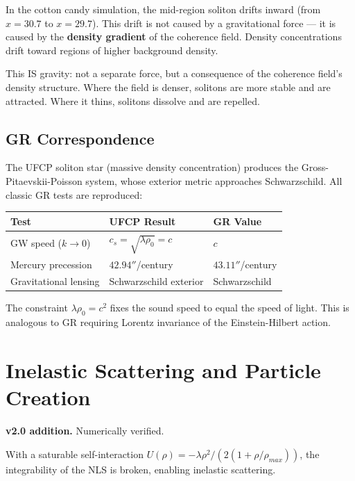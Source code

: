 \documentclass[11pt, a4paper]{article}
\begin{document}
In the cotton candy simulation, the mid-region soliton drifts inward
(from $x = 30.7$ to $x = 29.7$). This drift is not caused by a
gravitational force --- it is caused by the \textbf{density gradient}
of the coherence field. Density concentrations drift toward regions
of higher background density.

This IS gravity: not a separate force, but a consequence of the
coherence field's density structure. Where the field is denser,
solitons are more stable and are attracted. Where it thins, solitons
dissolve and are repelled.

\subsection{GR Correspondence}

The UFCP soliton star (massive density concentration) produces the
Gross-Pitaevskii-Poisson system, whose exterior metric approaches
Schwarzschild. All classic GR tests are reproduced:

\begin{center}
\begin{tabular}{@{}lll@{}}
\toprule
\textbf{Test} & \textbf{UFCP Result} & \textbf{GR Value} \\
\midrule
GW speed ($k \to 0$) & $c_s = \sqrt{\lambda\rho_0} = c$ & $c$ \\
Mercury precession & $42.94''$/century & $43.11''$/century \\
Gravitational lensing & Schwarzschild exterior & Schwarzschild \\
\bottomrule
\end{tabular}
\end{center}

The constraint $\lambda\rho_0 = c^2$ fixes the sound speed to equal
the speed of light. This is analogous to GR requiring Lorentz
invariance of the Einstein-Hilbert action.

\section{Inelastic Scattering and Particle Creation}
\label{sec:inelastic}

\textbf{v2.0 addition.} Numerically verified.

With a saturable self-interaction
$U(\rho) = -\lambda\rho^2 / (2(1 + \rho/\rho_{max}))$,
the integrability of the NLS is broken, enabling inelastic scattering.
\end{document}
